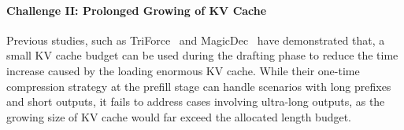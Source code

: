 \paragraph{Challenge II: Prolonged Growing of KV Cache}
\label{sec:load_kv}
Previous studies, such as TriForce~\citep{triforce} and MagicDec~\citep{magicdec} have demonstrated that, a small KV cache budget can be used during the drafting phase to reduce the time increase caused by the loading enormous KV cache. 
While their one-time compression strategy at the prefill stage can handle scenarios with long prefixes and short outputs, it fails to address cases involving ultra-long outputs, as the growing size of KV cache would far exceed the allocated length budget.



